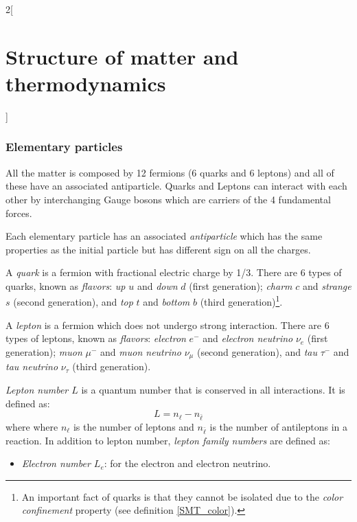 \documentclass[../../../main.tex]{subfiles}
\begin{document}
\begin{multicols}{2}[\section{Structure of matter and thermodynamics}]
    \subsubsection*{Elementary particles}
    \begin{definition}
        All the matter is composed by 12 fermions (6 quarks and 6 leptons) and all of these have an associated antiparticle. Quarks and Leptons can interact with each other by interchanging Gauge bosons which are carriers of the 4 fundamental forces.
    \end{definition}
    \begin{definition}[Antimatter]
        Each elementary particle has an associated \textit{antiparticle} which has the same properties as the initial particle but has different sign on all the charges.
    \end{definition}
    \begin{definition}[Quark]
        A \textit{quark} is a fermion with fractional electric charge by 1/3. There are 6 types of quarks, known as \textit{flavors}: \textit{up} $u$ and \textit{down} $d$ (first generation); \textit{charm} $c$ and \textit{strange} $s$ (second generation), and \textit{top} $t$ and \textit{bottom} $b$ (third generation)\footnote{An important fact of quarks is that they cannot be isolated due to the \textit{color confinement} property (see definition \ref{SMT_color}).}.
    \end{definition}
    \begin{definition}[Lepton]
        A \textit{lepton} is a fermion which does not undergo strong interaction. There are 6 types of leptons, known as \textit{flavors}: \textit{electron} $e^-$ and \textit{electron neutrino} $\nu_e$ (first generation); \textit{muon} $\mu^-$ and \textit{muon neutrino} $\nu_\mu$ (second generation), and \textit{tau} $\tau^-$ and \textit{tau neutrino} $\nu_\tau$ (third generation).
    \end{definition}
    \begin{definition}
        \textit{Lepton number $L$} is a quantum number that is conserved in all interactions. It is defined as: $$L=n_\ell-n_{\bar{\ell}}$$ where where  $n_\ell$ is the number of leptons and $n_{\bar{\ell}}$ is the number of antileptons in a reaction. In addition to lepton number, \textit{lepton family numbers} are defined as:
        \begin{itemize}
            \item \textit{Electron number $L_e$}: for the electron and electron neutrino.

\end{itemize}
\end{definition}
\end{multicols}
\end{document}
